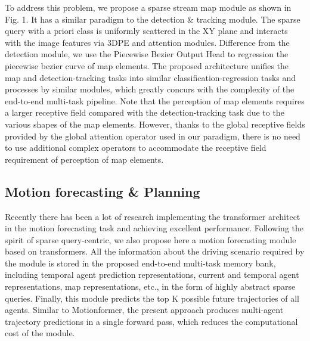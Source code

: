 To address this problem, we propose a sparse stream map module as shown in Fig. 1. It has a similar paradigm to the detection \& tracking module. The sparse query with a priori class is uniformly scattered in the XY plane and interacts with the image features via 3DPE\cite{liu2022petr,yan2023cross} and attention modules. Difference from the detection module, we use the Piecewise Bezier Output Head\cite{qiao2023end} to regression the piecewise bezier curve of map elements. The proposed architecture unifies the map and detection-tracking tasks into similar classification-regression tasks and processes by similar modules, which greatly concurs with the complexity of the end-to-end multi-task pipeline. Note that the perception of map elements requires a larger receptive field compared with the detection-tracking task due to the various shapes of the map elements\cite{yuan2024streammapnet}. However, thanks to the global receptive fields provided by the global attention operator\cite{vaswani2017attention} used in our paradigm, there is no need to use additional complex operators to accommodate the receptive field requirement of perception of map elements.

\subsection{Motion forecasting \& Planning}





Recently there has been a lot of research implementing the transformer architect in the motion forecasting task and achieving excellent performance\cite{zhou2022hivt,gao2020vectornet,chai2019multipath,zhang2023real,ngiam2021scene,zhou2023query}. Following the spirit of sparse query-centric, we also propose here a motion forecasting module based on transformers. All the information about the driving scenario required by the module is stored in the proposed end-to-end multi-task memory bank, including temporal agent prediction representations, current and temporal agent representations, map representations, etc., in the form of highly abstract sparse queries. Finally, this module predicts the top K possible future trajectories of all agents. Similar to Motionformer\cite{hu2023planning,shi2022motion}, the present approach produces multi-agent trajectory predictions in a single forward pass, which reduces the computational cost of the module.


